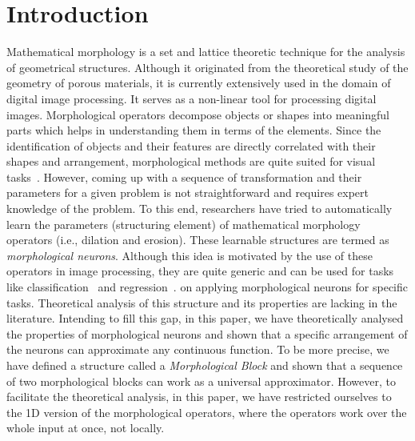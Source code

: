 \documentclass{bmvc2k}
\begin{document}
\section{Introduction}
Mathematical morphology is a set and lattice theoretic technique for the analysis of geometrical structures. Although it originated from the theoretical study of the geometry of porous materials, it is currently extensively used in the domain of digital image processing. 
It serves as a non-linear tool for processing digital images. 
Morphological operators decompose objects or shapes into meaningful parts which helps in understanding them in terms of the elements. Since the identification of objects and their features are directly correlated with their shapes and arrangement, morphological methods are quite suited for visual tasks~\cite{Haralick1992computer}. 
However, coming up with a sequence of transformation and their parameters for a given problem is not straightforward and requires expert knowledge of the problem. 
To this end, researchers have tried to automatically learn the parameters (structuring element) of mathematical morphology operators (i.e., dilation and erosion). These learnable structures are termed as \emph{morphological neurons}. Although this idea is motivated by the use of these operators in image processing, they are quite generic and can be used for tasks like classification~\cite{ritter_introduction_1996,sussner_morphological_2011} and regression~\cite{de_a._araujo_morphological_2012}. on applying morphological neurons for specific tasks.  Theoretical analysis of this structure and its properties are lacking in the literature. 
Intending to fill this gap, in this paper, we have theoretically analysed the properties of morphological neurons and shown that a specific arrangement of the neurons can approximate any continuous function. To be more precise, we have defined a structure called a \emph{Morphological Block} and shown that a sequence of two morphological blocks can work as a universal approximator. However, to facilitate the theoretical analysis, in this paper, we have restricted ourselves to the 1D version of the morphological operators, where the operators work over the whole input at once, not locally. 
\end{document}
